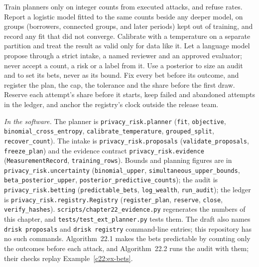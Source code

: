 \begin{inpractice}
Train planners only on integer counts from executed attacks, and refuse rates. Report a logistic
model fitted to the same counts beside any deeper model, on groups (borrowers, connected groups,
and later periods) kept out of training, and record any fit that did not converge. Calibrate with a
temperature on a separate partition and treat the result as valid only for data like it. Let a
language model propose through a strict intake, a named reviewer and an approved evaluator; never
accept a count, a risk or a label from it. Use a posterior to size an audit and to set its bets,
never as its bound. Fix every bet before its outcome, and register the plan, the cap, the tolerance
and the share before the first draw. Reserve each attempt's share before it starts, keep failed and
abandoned attempts in the ledger, and anchor the registry's clock outside the release team.

\medskip\noindent\textit{In the software.} The planner is \texttt{privacy\_risk.planner} (\texttt{fit}, \texttt{objective},
\texttt{binomial\_cross\_entropy}, \texttt{calibrate\_temperature}, \texttt{grouped\_split}, \texttt{recover\_count}). The intake is
\texttt{privacy\_risk.proposals} (\texttt{validate\_proposals}, \texttt{freeze\_plan}) and the evidence contract
\texttt{privacy\_risk.evidence} (\texttt{MeasurementRecord}, \texttt{training\_rows}). Bounds and planning figures are in
\texttt{privacy\_risk.uncertainty} (\texttt{binomial\_upper}, \texttt{simultaneous\_upper\_bounds}, \texttt{beta\_posterior\_upper},
\texttt{posterior\_predictive\_counts}); the audit is \texttt{privacy\_risk.betting} (\texttt{predictable\_bets}, \texttt{log\_wealth},
\texttt{run\_audit}); the ledger is \texttt{privacy\_risk.registry.Registry} (\texttt{register\_plan}, \texttt{reserve}, \texttt{close},
\texttt{verify\_hashes}). \texttt{scripts/chapter22\_evidence.py} regenerates the numbers of this chapter, and \texttt{tests/test\_ext\_planner.py} tests them. The draft also names
\texttt{drisk proposals} and \texttt{drisk registry} command-line entries; this repository has no such commands. Algorithm~22.1 makes
the bets predictable by counting only the outcomes before each attack, and Algorithm~22.2 runs the audit with them; their
checks replay Example~\ref{c22:ex-bets}.
\end{inpractice}

